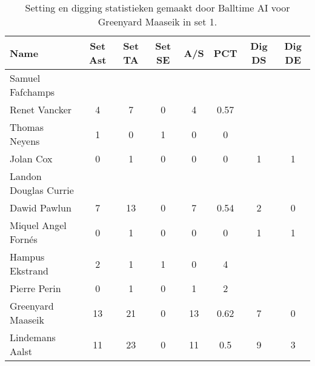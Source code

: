 \begin{table}[ht!]
  \centering
  \scriptsize
  \begin{tabular}{|l|c|c|c|c|c|c|c|}  \hline
    \textbf{Name} & Set Ast & Set TA & Set SE & A/S & PCT & Dig DS & Dig DE \\ \hline
    Samuel Fafchamps &  &  &  &  &  &  &  \\
    Renet Vancker & 4 & 7 & 0 & 4 & 0.57 &  &  \\
    Thomas Neyens & 1 & 0 & 1 & 0 & 0 &  &  \\
    Jolan Cox & 0 & 1 & 0 & 0 & 0 & 1 & 1 \\
    Landon Douglas Currie &  &  &  &  &  &  &  \\
    Dawid Pawlun & 7 & 13 & 0 & 7 & 0.54 & 2 & 0 \\
    Miquel Angel Fornés & 0 & 1 & 0 & 0 & 0 & 1 & 1 \\
    Hampus Ekstrand & 2 & 1 & 1 & 0 & 4 &  &  \\
    Pierre Perin & 0 & 1 & 0 & 1 & 2 &  &  \\
    Greenyard Maaseik & 13 & 21 & 0 & 13 & 0.62 & 7 & 0 \\
    Lindemans Aalst & 11 & 23 & 0 & 11 & 0.5 & 9 & 3 \\ \hline
  \end{tabular}
  \caption[Setting en digging statistieken gemaakt door Balltime AI voor Greenyard Maaseik in set 1]{\label{tab:PL1SetDigMaaseik1}Setting en digging statistieken gemaakt door Balltime AI voor Greenyard Maaseik in set 1.}
\end{table}

